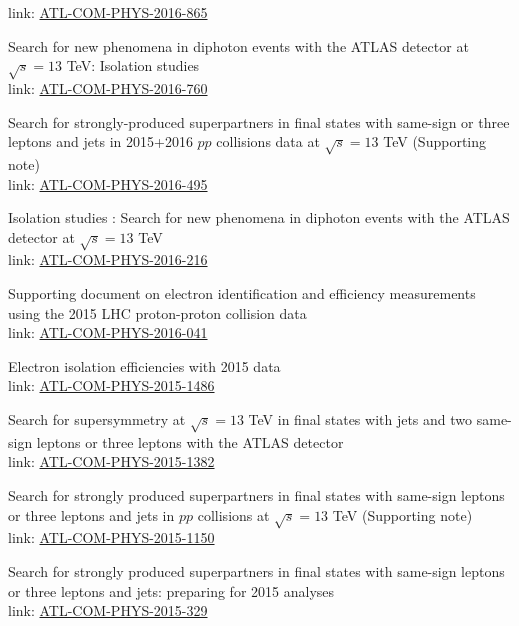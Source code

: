 \documentclass[letterpaper]{deedy-resume-openfont}
\begin{document}
\begin{tightemize}
      link: \href{https://cds.cern.ch/record/2196580}{ATL-COM-PHYS-2016-865}
\item Search for new phenomena in diphoton events with the ATLAS detector at $\sqrt{s} = 13$ TeV: Isolation studies\\
      link: \href{https://cds.cern.ch/record/2162758}{ATL-COM-PHYS-2016-760}
\item Search for strongly-produced superpartners in final states with same-sign or three leptons and jets in 2015+2016 $pp$ collisions data at $\sqrt{s} = 13$ TeV (Supporting note)\\
      link: \href{https://cds.cern.ch/record/2151944}{ATL-COM-PHYS-2016-495}
\item Isolation studies : Search for new phenomena in diphoton events with the ATLAS detector at $\sqrt{s} = 13$ TeV\\
      link: \href{https://cds.cern.ch/record/2136940}{ATL-COM-PHYS-2016-216}
\item Supporting document on electron identification and efficiency measurements using the 2015 LHC proton-proton collision data\\
      link: \href{https://cds.cern.ch/record/2125283}{ATL-COM-PHYS-2016-041}
\item Electron isolation efficiencies with 2015 data\\
      link: \href{https://cds.cern.ch/record/2112167}{ATL-COM-PHYS-2015-1486}
\item Search for supersymmetry at $\sqrt{s} = 13$ TeV in final states with jets and two same-sign leptons or three leptons with the ATLAS detector\\
      link: \href{https://cds.cern.ch/record/2102919}{ATL-COM-PHYS-2015-1382}
\item Search for strongly produced superpartners in final states with same-sign leptons or three leptons and jets in $pp$ collisions at $\sqrt{s} = 13$ TeV (Supporting note)\\
      link: \href{https://cds.cern.ch/record/2052581}{ATL-COM-PHYS-2015-1150}
\item Search for strongly produced superpartners in final states with same-sign leptons or three leptons and jets: preparing for 2015 analyses\\
      link: \href{https://cds.cern.ch/record/2012029}{ATL-COM-PHYS-2015-329}
\end{tightemize}
\sectionsep


\end{document}
